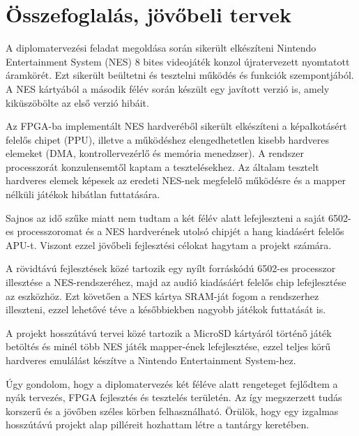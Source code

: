 \chapter{Összefoglalás, jövőbeli tervek}

A diplomatervezési feladat megoldása során sikerült elkészíteni Nintendo Entertainment System (NES) 8 bites videojáték konzol újratervezett nyomtatott áramkörét. Ezt sikerült beültetni és tesztelni működés és funkciók szempontjából. A NES kártyából a második félév során készült egy javított verzió is, amely kiküszöbölte az első verzió hibáit. 

Az FPGA-ba implementált NES hardveréből sikerült elkészíteni a képalkotásért felelős chipet (PPU), illetve a működéshez elengedhetetlen kisebb hardveres elemeket (DMA, kontrollervezérlő és memória menedzser). A rendszer processzorát konzulensemtől kaptam a tesztelésekhez. Az általam tesztelt hardveres elemek képesek az eredeti NES-nek megfelelő működésre és a mapper nélküli játékok hibátlan futtatására. 

Sajnos az idő szűke miatt nem tudtam a két félév alatt lefejleszteni a saját 6502-es processzoromat és a NES hardverének utolsó chipjét a hang kiadásért felelős APU-t. Viszont ezzel jövőbeli fejlesztési célokat hagytam a projekt számára.

A rövidtávú fejlesztések közé tartozik egy nyílt forráskódú 6502-es processzor illesztése a NES-rendszeréhez, majd az audió kiadásáért felelős chip lefejlesztése az eszközhöz. Ezt követően a NES kártya SRAM-ját fogom a rendszerhez illeszteni, ezzel lehetővé téve a későbbiekben nagyobb játékok futtatását is.

A projekt hosszútávú tervei közé tartozik a MicroSD kártyáról történő játék betöltés és minél több NES játék mapper-ének lefejlesztése, ezzel teljes körű hardveres emulálást készítve a Nintendo Entertainment System-hez. 

Úgy gondolom, hogy a diplomatervezés két féléve alatt rengeteget fejlődtem a nyák tervezés, FPGA fejlesztés és tesztelés területén. Az így megszerzett tudás korszerű és a jövőben széles körben felhasználható. Örülök, hogy egy izgalmas hosszútávú projekt alap pilléreit hozhattam létre a tantárgy keretében.  